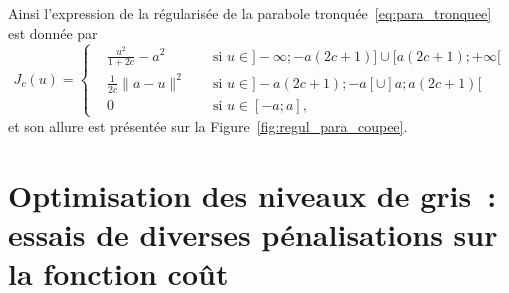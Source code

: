 \documentclass[main.tex]{subfiles}
\begin{document}
Ainsi l'expression de la régularisée de la parabole tronquée~\ref{eq:para_tronquee} est donnée par
\begin{equation}\label{eq:regul_parabole_coupee}
J_c(u) = \left\{  \begin{aligned}
&\frac{u^2}{1+2c}-a^2 && \textrm{ si } u\in ]-\infty;-a(2c+1)] \cup [a(2c+1);+\infty[  \\
&\frac{1}{2c}\|a-u\|^2 && \textrm{ si } u \in ]-a(2c+1);-a[ \cup ]a;a(2c+1) [ \\
&0 && \textrm{ si } u\in [-a;a],
\end{aligned}  \right.
\end{equation}
et son allure est présentée sur la Figure~\ref{fig:regul_para_coupee}.

\section{Optimisation des niveaux de gris~: essais de diverses pénalisations sur la fonction coût}
\end{document}

